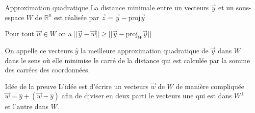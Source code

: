 \begin{parag}{Approximation quadratique}
    La distance minimale entre un vecteurs $\vec{y}$ et un sous-espace $W$ de $\mathbb{R}^n$ est réalisée par $\vec{z} = \vec{y} - \text{proj}\vec{y}$
    \begin{theoreme}
        Pour tout $\vec{w} \in W$ on a $||\vec{y} - \vec{w}|| \geq ||\vec{y} - \text{proj}_W\vec{y}||$
    \end{theoreme}
    On appelle ce vecteurs $\hat{y}$ la meilleure approximation quadratique de $\vec{y}$ dans $W$ dans le sens où elle minimise le carré de la distance qui est calculée par la somme des carrées des coordonnées.
    \begin{subparag}{Idée de la preuve}
            L'idée est d'écrire un vecteurs $\vec{w}$ de $W$ de manière compliquée $\vec{w} = \hat{y} + (\vec{w} - \hat{y})$ afin de diviser en deux parti le vecteurs une qui est dans $W^\perp$ et l'autre dans $W$.
    \end{subparag}
\end{parag}

